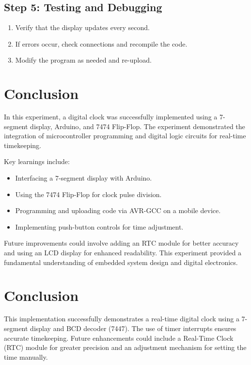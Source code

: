 \documentclass[a4paper,12pt]{article}
\begin{document}
\subsection{Step 5: Testing and Debugging}
\begin{enumerate}
    \item Verify that the display updates every second.
    \item If errors occur, check connections and recompile the code.
    \item Modify the program as needed and re-upload.
\end{enumerate}

\section{Conclusion}

In this experiment, a digital clock was successfully implemented using a {7-segment display}, {Arduino}, and {7474 Flip-Flop}. The experiment demonstrated the integration of {microcontroller programming} and {digital logic circuits} for real-time timekeeping.

Key learnings include:
\begin{itemize}
    \item Interfacing a 7-segment display with Arduino.
    \item Using the 7474 Flip-Flop for clock pulse division.
    \item Programming and uploading code via AVR-GCC on a mobile device.
    \item Implementing push-button controls for time adjustment.
\end{itemize}

Future improvements could involve adding an {RTC module} for better accuracy and using an {LCD display} for enhanced readability. This experiment provided a fundamental understanding of embedded system design and digital electronics.




\section{Conclusion}

This implementation successfully demonstrates a {real-time digital clock} using a {7-segment display} and {BCD decoder (7447)}. The use of {timer interrupts} ensures accurate timekeeping. Future enhancements could include a {Real-Time Clock (RTC) module} for greater precision and an {adjustment mechanism} for setting the time manually.
\end{document}
